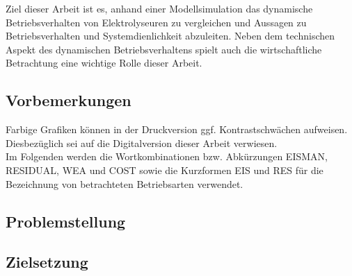 \documentclass[onecolumn,10pt,titlepage]{article}
\begin{document}
Ziel dieser Arbeit ist es, anhand einer Modellsimulation das dynamische Betriebsverhalten von Elektrolyseuren zu vergleichen und  Aussagen zu Betriebsverhalten und Systemdienlichkeit abzuleiten. Neben dem technischen Aspekt des dynamischen Betriebsverhaltens spielt auch die wirtschaftliche Betrachtung eine wichtige Rolle dieser Arbeit.\\

\subsection{Vorbemerkungen}
Farbige Grafiken können in der Druckversion ggf. Kontrastschwächen aufweisen. Diesbezüglich sei auf die Digitalversion dieser Arbeit verwiesen.\\
Im Folgenden werden die Wortkombinationen bzw. Abkürzungen EISMAN, RESIDUAL, WEA und COST sowie die Kurzformen EIS und RES für die Bezeichnung von betrachteten Betriebsarten verwendet.  


\subsection{Problemstellung}



\subsection{Zielsetzung}
\end{document}
